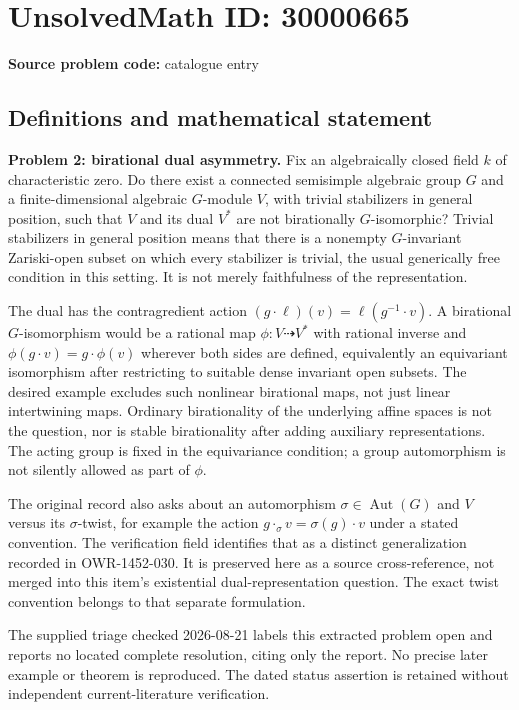 \documentclass[11pt]{article}
\begin{document}
\section*{UnsolvedMath ID: 30000665}
\textbf{Source problem code:} catalogue entry
\subsection{Definitions and mathematical statement}
\textbf{Problem 2: birational dual asymmetry.} Fix an algebraically closed field \(k\) of characteristic zero. Do there exist a connected semisimple algebraic group \(G\) and a finite-dimensional algebraic \(G\)-module \(V\), with trivial stabilizers in general position, such that \(V\) and its dual \(V^*\) are not birationally \(G\)-isomorphic? Trivial stabilizers in general position means that there is a nonempty \(G\)-invariant Zariski-open subset on which every stabilizer is trivial, the usual generically free condition in this setting. It is not merely faithfulness of the representation.\par The dual has the contragredient action \((g\cdot\ell)(v)=\ell(g^{-1}\cdot v)\). A birational \(G\)-isomorphism would be a rational map \(\phi:V\dashrightarrow V^*\) with rational inverse and \(\phi(g\cdot v)=g\cdot\phi(v)\) wherever both sides are defined, equivalently an equivariant isomorphism after restricting to suitable dense invariant open subsets. The desired example excludes such nonlinear birational maps, not just linear intertwining maps. Ordinary birationality of the underlying affine spaces is not the question, nor is stable birationality after adding auxiliary representations. The acting group is fixed in the equivariance condition; a group automorphism is not silently allowed as part of \(\phi\).\par The original record also asks about an automorphism \(\sigma\in\operatorname{Aut}(G)\) and \(V\) versus its \(\sigma\)-twist, for example the action \(g\cdot_\sigma v=\sigma(g)\cdot v\) under a stated convention. The verification field identifies that as a distinct generalization recorded in OWR-1452-030. It is preserved here as a source cross-reference, not merged into this item's existential dual-representation question. The exact twist convention belongs to that separate formulation.\par The supplied triage checked 2026-08-21 labels this extracted problem open and reports no located complete resolution, citing only the report. No precise later example or theorem is reproduced. The dated status assertion is retained without independent current-literature verification.
\end{document}
